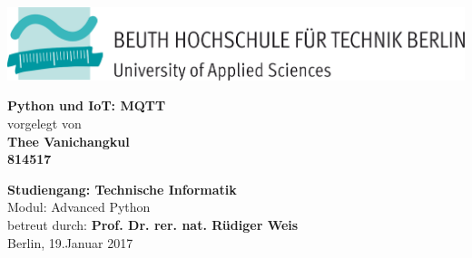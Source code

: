 \begin{center}

	\begin{center}
      \includegraphics[scale=0.2,angle=0]{Beuth.png}\\\vspace{2.5cm}
    \end{center}
    
 	{\bf {\huge Python und IoT: MQTT}}\\
    {\normalsize vorgelegt von}\\
    {\bf Thee Vanichangkul \\
    814517} \\\vspace{2cm}

    {\normalsize{\bf Studiengang: Technische Informatik}} \\\vspace{0.5cm}
	{\normalsize Modul: Advanced Python\\\vspace{0.5cm}
	betreut durch: {\bf Prof. Dr. rer. nat. Rüdiger Weis} \\\vspace{8.5cm}
    Berlin, 19.Januar 2017}

\end{center}
